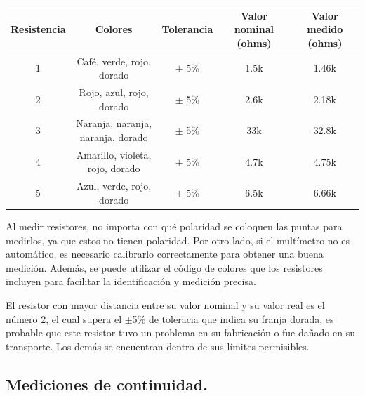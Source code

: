 \documentclass[10pt]{article}
\begin{document}
\begin{multicols}{2}
\begin{center}
	\begin{adjustbox}{width=245pt}
		\begin{tabular}{|c|c|c|c|c|}
			\hline
			Resistencia & Colores & Tolerancia & Valor nominal (ohms) & Valor medido (ohms) \\
			\hline
			1 & Café, verde, rojo, dorado & $\pm$ 5\% & 1.5k & 1.46k \\
			\hline
			2 & Rojo, azul, rojo, dorado & $\pm$ 5\% & 2.6k & 2.18k \\
			\hline
			3 & Naranja, naranja, naranja, dorado & $\pm$ 5\% & 33k & 32.8k \\
			\hline
			4 & Amarillo, violeta, rojo, dorado & $\pm$ 5\% & 4.7k & 4.75k \\
			\hline
			5 & Azul, verde, rojo, dorado & $\pm$ 5\% & 6.5k & 6.66k \\
			\hline
		\end{tabular}
	\end{adjustbox}
\end{center}

Al medir resistores, no importa con qué polaridad se coloquen las puntas para medirlos, ya que estos no tienen polaridad. Por otro lado, si el multímetro no es automático, es necesario calibrarlo correctamente para obtener una buena medición. Además, se puede utilizar el código de colores que los resistores incluyen para facilitar la identificación y medición precisa.

El resistor con mayor distancia entre su valor nominal y su valor real es el número 2, el cual supera el $\pm$5\% de toleracia que indica su franja dorada, es probable que este resistor tuvo un problema en su fabricación o fue dañado en su transporte. Los demás se encuentran dentro de sus límites permisibles.
\subsection{Mediciones de continuidad.}


\end{multicols}
\end{document}
